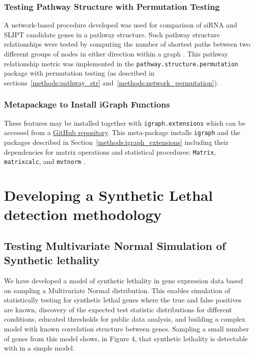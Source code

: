 \subsubsection{Testing Pathway Structure with Permutation Testing}
A network-based procedure developed was used for comparison of \gls{siRNA} and \gls{SLIPT} candidate genes in a pathway structure. Such pathway structure relationships were tested by computing the number of shortest paths between two different groups of nodes in either direction within a graph . This pathway relationship metric was implemented in the \texttt{pathway.structure.permutation} package with permutation testing (as described in sections~\ref{methods:pathway_str} and~\ref{methods:network_permutation}). 

\subsubsection{Metapackage to Install iGraph Functions}
These features may be installed together with \texttt{igraph.extensions} which can be accessed from a \href{https://github.com/TomKellyGenetics/igraph.extensions}{GitHub repository}. This meta-package installs \texttt{igraph} \citep{igraph} and the packages described in Section~\ref{methods:igraph_extensions} including their dependencies for matrix operations and statistical procedures: \texttt{Matrix}, \texttt{matrixcalc}, and \texttt{mvtnorm} \citep{Matrix, matrixcalc, Genz2009, mvtnorm}.


\iffalse
\section{Developing a Synthetic Lethal detection methodology}

\subsection{Testing Multivariate Normal Simulation of Synthetic lethality}

We have developed a model of synthetic lethality in gene expression data based on sampling a Multivariate Normal distribution.  This enables simulation of statistically testing for synthetic lethal genes where the true and false positives are known, discovery of the expected test statistic distributions for different conditions, educated thresholds for public data analysis, and building a complex model with known correlation structure between genes.  Sampling a small number of genes from this model shows, in Figure 4, that synthetic lethality is detectable with in a simple model.

